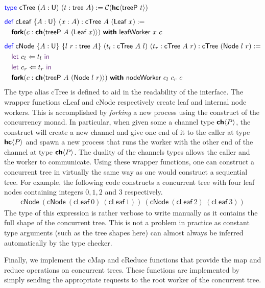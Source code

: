 \vspace{-1em}
\begingroup
\small
\addtolength{\jot}{-0.2em}
\begin{align*}
  &\Type\ \textsf{cTree}\ (A : \Un)\ (t : \textsf{tree}\ A) := \CM{\HC{\textsf{treeP}\ t}}
  \\[0.5em]
  &\Def\ \textsf{cLeaf}\ \{A : \Un\}\ (x : A) : \textsf{cTree}\ A\ (\textsf{Leaf}\ x) := \\
  &\quad\Fork(c : \CH{\textsf{treeP}\ A\ (\textsf{Leaf}\ x)})\ \With\ \textsf{leafWorker}\ x\ c
  \\[0.5em]
  &\Def\ \textsf{cNode}\ \{A : \Un\}\ \{l\ r : \textsf{tree}\ A\}\ (t_l : \textsf{cTree}\ A\ l)\ (t_r : \textsf{cTree}\ A\ r) : \textsf{cTree}\ (\textsf{Node}\ l\ r) := \\
  &\quad\Let\ c_l \Leftarrow t_l\ \In \\
  &\quad\Let\ c_r \Leftarrow t_r\ \In \\
  &\quad\Fork(c : \CH{\textsf{treeP}\ A\ (\textsf{Node}\ l\ r)})\ \With\ \textsf{nodeWorker}\ c_l\ c_r\ c
\end{align*}
\endgroup
The type alias \textsf{cTree} is defined to aid in the readability of the interface.
The wrapper functions \textsf{cLeaf} and \textsf{cNode} respectively create leaf
and internal node workers. This is accomplished by \emph{forking} a new process using
the \Fork{} construct of the concurrency monad. In particular, when given some a channel type
${\textbf{\textsf{ch}}\langle{P}\rangle}$, the \Fork{} construct will create a new channel and give one end of it to the caller
at type ${\textbf{\textsf{hc}}\langle{P}\rangle}$ and spawn a new process that runs the worker with the other end of the channel
at type ${\textbf{\textsf{ch}}\langle{P}\rangle}$. The duality of the channels types allows the caller and the worker to communicate.
Using these wrapper functions, one can construct a concurrent tree in virtually the same way
as one would construct a sequential tree. For example, the following code constructs a
concurrent tree with four leaf nodes containing integers $0, 1, 2$ and
$3$ respectively.
\begin{align*}
  \textsf{cNode}\ (\textsf{cNode}\ (\textsf{cLeaf}\ 0)\ (\textsf{cLeaf}\ 1))\ (\textsf{cNode}\ (\textsf{cLeaf}\ 2)\ (\textsf{cLeaf}\ 3))
\end{align*}
The type of this expression is rather verbose to write manually as it contains the full shape
of the concurrent tree. This is not a problem in practice as constant type arguments
(such as the tree shapes here) can almost always be inferred automatically by the type checker.

Finally, we implement the \textsf{cMap} and \textsf{cReduce} functions that provide the
map and reduce operations on concurrent trees. These functions are implemented by
simply sending the appropriate requests to the root worker of the concurrent tree.

